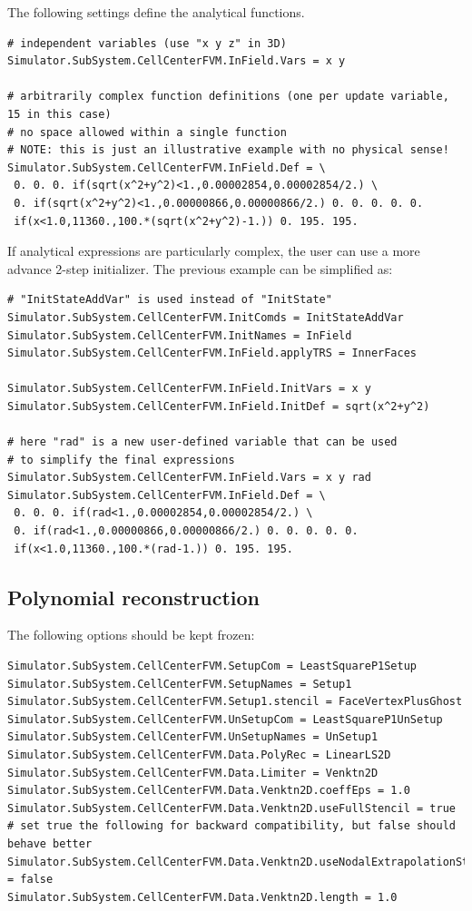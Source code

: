 \documentclass[11pt]{article}
\begin{document}
The following settings define the analytical functions.
\begin{lstlisting}[breaklines] 
# independent variables (use "x y z" in 3D)
Simulator.SubSystem.CellCenterFVM.InField.Vars = x y  

# arbitrarily complex function definitions (one per update variable, 15 in this case)
# no space allowed within a single function
# NOTE: this is just an illustrative example with no physical sense!
Simulator.SubSystem.CellCenterFVM.InField.Def = \
 0. 0. 0. if(sqrt(x^2+y^2)<1.,0.00002854,0.00002854/2.) \
 0. if(sqrt(x^2+y^2)<1.,0.00000866,0.00000866/2.) 0. 0. 0. 0. 0. 
 if(x<1.0,11360.,100.*(sqrt(x^2+y^2)-1.)) 0. 195. 195.
\end{lstlisting}

If analytical expressions are particularly complex, the user can use a more advance
2-step initializer. The previous example can be simplified as:

\begin{lstlisting}[breaklines]
# "InitStateAddVar" is used instead of "InitState"
Simulator.SubSystem.CellCenterFVM.InitComds = InitStateAddVar
Simulator.SubSystem.CellCenterFVM.InitNames = InField
Simulator.SubSystem.CellCenterFVM.InField.applyTRS = InnerFaces

Simulator.SubSystem.CellCenterFVM.InField.InitVars = x y
Simulator.SubSystem.CellCenterFVM.InField.InitDef = sqrt(x^2+y^2)

# here "rad" is a new user-defined variable that can be used 
# to simplify the final expressions 
Simulator.SubSystem.CellCenterFVM.InField.Vars = x y rad
Simulator.SubSystem.CellCenterFVM.InField.Def = \
 0. 0. 0. if(rad<1.,0.00002854,0.00002854/2.) \
 0. if(rad<1.,0.00000866,0.00000866/2.) 0. 0. 0. 0. 0. 
 if(x<1.0,11360.,100.*(rad-1.)) 0. 195. 195.
\end{lstlisting}

\subsection{Polynomial reconstruction}

The following options should be kept frozen:

\begin{lstlisting}[breaklines]
Simulator.SubSystem.CellCenterFVM.SetupCom = LeastSquareP1Setup
Simulator.SubSystem.CellCenterFVM.SetupNames = Setup1
Simulator.SubSystem.CellCenterFVM.Setup1.stencil = FaceVertexPlusGhost
Simulator.SubSystem.CellCenterFVM.UnSetupCom = LeastSquareP1UnSetup
Simulator.SubSystem.CellCenterFVM.UnSetupNames = UnSetup1
Simulator.SubSystem.CellCenterFVM.Data.PolyRec = LinearLS2D
Simulator.SubSystem.CellCenterFVM.Data.Limiter = Venktn2D
Simulator.SubSystem.CellCenterFVM.Data.Venktn2D.coeffEps = 1.0
Simulator.SubSystem.CellCenterFVM.Data.Venktn2D.useFullStencil = true
# set true the following for backward compatibility, but false should behave better
Simulator.SubSystem.CellCenterFVM.Data.Venktn2D.useNodalExtrapolationStencil = false
Simulator.SubSystem.CellCenterFVM.Data.Venktn2D.length = 1.0
\end{lstlisting}
\end{document}
